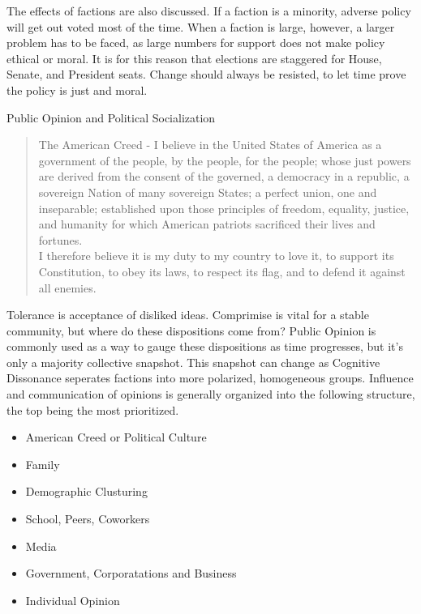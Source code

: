 \documentclass{article}
\begin{document}
The effects of factions are also discussed. If a faction is a minority, adverse policy will get out voted most of the time. When a faction is large, however, a larger problem has to be faced, as large numbers for support does not make policy ethical or moral. It is for this reason that elections are staggered for House, Senate, and President seats. Change should always be resisted, to let time prove the policy is just and moral.

\noindent
\Large
Public Opinion and Political Socialization\\
\normalsize
\indent

\begin{quote}
  The American Creed - I believe in the United States of America as a government of the people, by the people, for the people; whose just powers are derived from the consent of the governed, a democracy in a republic, a sovereign Nation of many sovereign States; a perfect union, one and inseparable; established upon those principles of freedom, equality, justice, and humanity for which American patriots sacrificed their lives and fortunes.\\ I therefore believe it is my duty to my country to love it, to support its Constitution, to obey its laws, to respect its flag, and to defend it against all enemies.
\end{quote}

Tolerance is acceptance of disliked ideas. Comprimise is vital for a stable community, but where do these dispositions come from? Public Opinion is commonly used as a way to gauge these dispositions as time progresses, but it's only a majority collective snapshot. This snapshot can change as Cognitive Dissonance seperates factions into more polarized, homogeneous groups. Influence and communication of opinions is generally organized into the following structure, the top being the most prioritized.

\begin{itemize}
  \item American Creed or Political Culture
  \item Family
  \item Demographic Clusturing
  \item School, Peers, Coworkers
  \item Media
  \item Government, Corporatations and Business
  \item Individual Opinion
\end{itemize}
\end{document}
